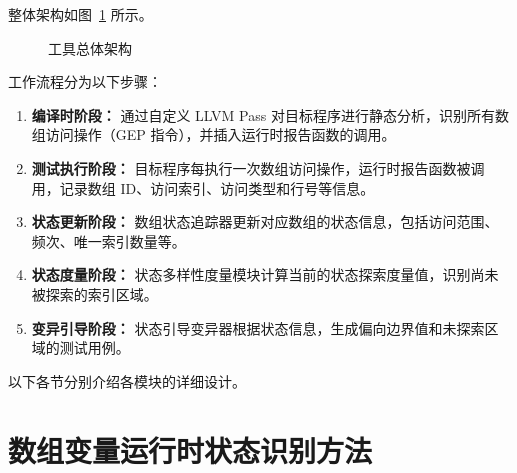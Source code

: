 \documentclass[bachelor]{njupthesis}
\begin{document}
整体架构如图~\ref{fig:arch} 所示。

\begin{figure}[hbt]
\centering
{}
\caption{工具总体架构}
\label{fig:arch}
\end{figure}

工作流程分为以下步骤：

\begin{enumerate}
    \item \textbf{编译时阶段：} 通过自定义 LLVM Pass 对目标程序进行静态分析，识别所有数组访问操作（GEP 指令），并插入运行时报告函数的调用。
    \item \textbf{测试执行阶段：} 目标程序每执行一次数组访问操作，运行时报告函数被调用，记录数组 ID、访问索引、访问类型和行号等信息。
    \item \textbf{状态更新阶段：} 数组状态追踪器更新对应数组的状态信息，包括访问范围、频次、唯一索引数量等。
    \item \textbf{状态度量阶段：} 状态多样性度量模块计算当前的状态探索度量值，识别尚未被探索的索引区域。
    \item \textbf{变异引导阶段：} 状态引导变异器根据状态信息，生成偏向边界值和未探索区域的测试用例。
\end{enumerate}

以下各节分别介绍各模块的详细设计。

\section{数组变量运行时状态识别方法}
\end{document}
